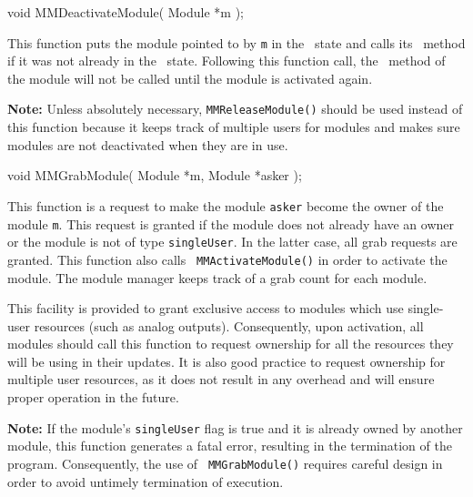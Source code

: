 \begin{prototype}
void MMDeactivateModule( Module *m );
\end{prototype}

This function puts the module pointed to by {\tt *m} in the \ModuleInactive\
state and calls its \deactivateFN\ method if it was not already in the
\ModuleInactive\ state. Following this function call, the \updateFN\ method
of the module will not be called until the module is activated again.

{\bf Note:} Unless absolutely necessary, {\tt MMReleaseModule()} should be
used instead of this function because it keeps track of multiple users for
modules and makes sure modules are not deactivated when they are in use.

\begin{prototype}
void MMGrabModule( Module *m, Module *asker );
\end{prototype}

This function is a request to make the module {\tt *asker} become the owner
of the module {\tt *m}. This request is granted if the module does not
already have an owner or the module is not of type {\tt singleUser}. In the
latter case, all grab requests are granted. This function also calls {\tt
MMActivateModule()} in order to activate the module. The module manager
keeps track of a grab count for each module.

This facility is provided to grant exclusive access to modules which use
single-user resources (such as analog outputs). Consequently, upon
activation, all modules should call this function to request ownership for
all the resources they will be using in their updates. It is also good
practice to request ownership for multiple user resources, as it does not
result in any overhead and will ensure proper operation in the future.


{\bf Note:} If the module's {\tt singleUser} flag is true and it is already
owned by another module, this function generates a fatal error, resulting in
the termination of the program. Consequently, the use of {\tt
MMGrabModule()} requires careful design in order to avoid untimely
termination of execution.


